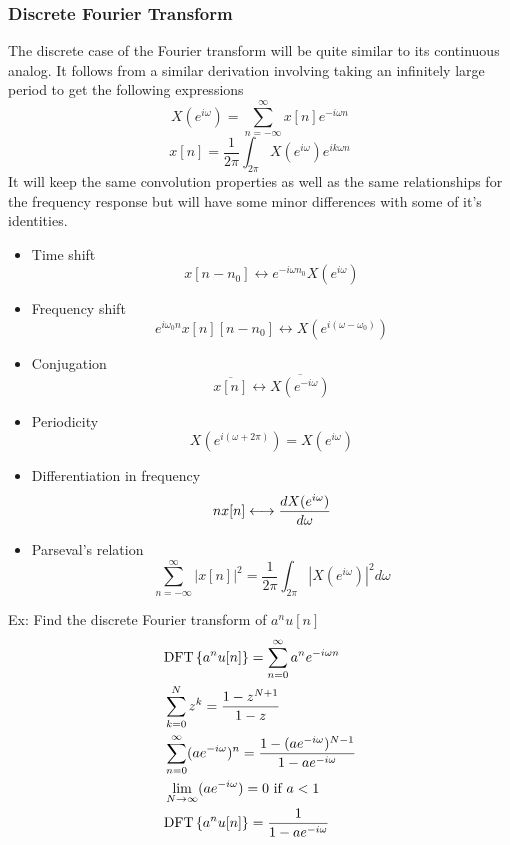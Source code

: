\documentclass[11pt, fleqn]{article}
\begin{document}
\subsubsection{Discrete Fourier Transform}
The discrete case of the Fourier transform will be quite similar to its continuous analog. It follows from a similar derivation involving taking an infinitely large period to get the following expressions
$$\boxed{X(e^{i\omega})=\sum_{n=-\infty}^\infty x[n]e^{-i\omega n}}$$
$$\boxed{x[n]=\frac{1}{2\pi}\int_{2\pi}X(e^{i\omega})e^{ik\omega n}}$$
It will keep the same convolution properties as well as the same relationships for the frequency response but will have some minor differences with some of it's identities.\\
\begin{itemize}
    \item Time shift
    $$x[n-n_0]\longleftrightarrow e^{-i\omega n_0}X(e^{i\omega})$$
    \item Frequency shift
    $$e^{i\omega_0n}x[n][n-n_0]\longleftrightarrow X(e^{i(\omega-\omega_0)})$$
    \item Conjugation
    $$\overline{x[n]}\longleftrightarrow\overline{X(e^{-i\omega})}$$
    \item Periodicity
    $$X(e^{i(\omega+2\pi)})=X(e^{i\omega})$$
    \item Differentiation in frequency
    $$nx[n]\longleftrightarrow \ddx[X(e^{i\omega})]{\omega}$$
    \item Parseval's relation
    $$\sum_{n=-\infty}^\infty |x[n]|^2=\frac{1}{2\pi}\int_{2\pi}|X(e^{i\omega})|^2d\omega$$
\end{itemize}
Ex: Find the discrete Fourier transform of $a^nu[n]$
\begin{align*}
    &\mathrm{DFT}\brcurly{a^nu[n]}=\sum_{n=0}^\infty a^ne^{-i\omega n}\\
    &\sum_{k=0}^{N} z^{k} = \frac{1 - z^{N+1}}{1 - z}\\
    &\sum_{n=0}^\infty (ae^{-i\omega})^n=\frac{1-(ae^{-i\omega})^{N-1}}{1-ae^{-i\omega}}\\
    &\lim_{N\to\infty}(ae^{-i\omega})=0\text{ if }a<1\\
    &\mathrm{DFT}\brcurly{a^nu[n]}=\frac{1}{1-ae^{-i\omega}}
\end{align*}
\end{document}
